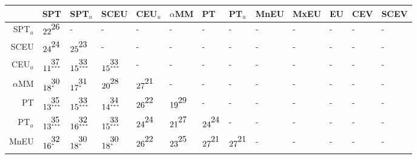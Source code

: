 \documentclass[11pt, a4paper, oneside,final,notitlepage,onecolumn]{article}\usepackage[]{graphicx}\usepackage[]{color}
\begin{document}
\begin{table}[!htb]
\centering
\begin{tabular}{rllllllllllll}
  \hline
 & SPT & SPT$_{u}$ & SCEU & CEU$_{u}$ & $\alpha$MM & PT & PT$_{u}$ & MnEU & MxEU & EU & CEV & SCEV \\ 
  \hline
SPT$_{u}$ & $22^{\stackrel{\textstyle26\hfill}{\scriptscriptstyle\hfill}}$ & - & - & - & - & - & - & - & - & - & - & - \\ 
  SCEU & $24^{\stackrel{\textstyle24\hfill}{\scriptscriptstyle\hfill}}$ & $25^{\stackrel{\textstyle23\hfill}{\scriptscriptstyle\hfill}}$ & - & - & - & - & - & - & - & - & - & - \\ 
  CEU$_{u}$ & $11^{\stackrel{\textstyle37\hfill}{\scriptscriptstyle***\hfill}}$ & $15^{\stackrel{\textstyle33\hfill}{\scriptscriptstyle***\hfill}}$ & $15^{\stackrel{\textstyle33\hfill}{\scriptscriptstyle***\hfill}}$ & - & - & - & - & - & - & - & - & - \\ 
  $\alpha$MM & $18^{\stackrel{\textstyle30\hfill}{\scriptscriptstyle*\hfill}}$ & $17^{\stackrel{\textstyle31\hfill}{\scriptscriptstyle*\hfill}}$ & $20^{\stackrel{\textstyle28\hfill}{\scriptscriptstyle\hfill}}$ & $27^{\stackrel{\textstyle21\hfill}{\scriptscriptstyle\hfill}}$ & - & - & - & - & - & - & - & - \\ 
  PT & $13^{\stackrel{\textstyle35\hfill}{\scriptscriptstyle***\hfill}}$ & $15^{\stackrel{\textstyle33\hfill}{\scriptscriptstyle***\hfill}}$ & $14^{\stackrel{\textstyle34\hfill}{\scriptscriptstyle***\hfill}}$ & $26^{\stackrel{\textstyle22\hfill}{\scriptscriptstyle\hfill}}$ & $19^{\stackrel{\textstyle29\hfill}{\scriptscriptstyle\hfill}}$ & - & - & - & - & - & - & - \\ 
  PT$_{u}$ & $13^{\stackrel{\textstyle35\hfill}{\scriptscriptstyle***\hfill}}$ & $16^{\stackrel{\textstyle32\hfill}{\scriptscriptstyle***\hfill}}$ & $15^{\stackrel{\textstyle33\hfill}{\scriptscriptstyle***\hfill}}$ & $24^{\stackrel{\textstyle24\hfill}{\scriptscriptstyle\hfill}}$ & $21^{\stackrel{\textstyle27\hfill}{\scriptscriptstyle\hfill}}$ & $24^{\stackrel{\textstyle24\hfill}{\scriptscriptstyle\hfill}}$ & - & - & - & - & - & - \\ 
  MnEU & $16^{\stackrel{\textstyle32\hfill}{\scriptscriptstyle*\hfill}}$ & $18^{\stackrel{\textstyle30\hfill}{\scriptscriptstyle*\hfill}}$ & $18^{\stackrel{\textstyle30\hfill}{\scriptscriptstyle*\hfill}}$ & $26^{\stackrel{\textstyle22\hfill}{\scriptscriptstyle\hfill}}$ & $23^{\stackrel{\textstyle25\hfill}{\scriptscriptstyle\hfill}}$ & $27^{\stackrel{\textstyle21\hfill}{\scriptscriptstyle\hfill}}$ & $27^{\stackrel{\textstyle21\hfill}{\scriptscriptstyle\hfill}}$ & - & - & - & - & - \\ 

\end{tabular}
\end{table}
\end{document}

